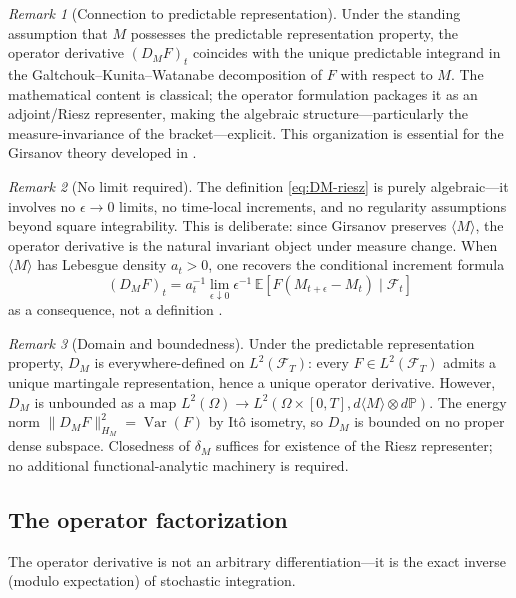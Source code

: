 \documentclass[11pt]{article}
\theoremstyle{plain}
\theoremstyle{definition}
\theoremstyle{remark}
\newtheorem{remark}{Remark}[section]
\newcommand{\E}{\mathbb{E}}
\newcommand{\F}{\mathcal{F}}
\newcommand{\PP}{\mathbb{P}}
\newcommand{\bracket}[1]{\langle #1 \rangle}
\DeclareMathOperator{\Var}{Var}
\begin{document}
\begin{remark}[Connection to predictable representation]\label{rem:connection-rep}
Under the standing assumption that $M$ possesses the predictable representation
property, the operator derivative $(D_M F)_t$ coincides with the unique predictable
integrand in the Galtchouk--Kunita--Watanabe decomposition of $F$ with respect to $M$.
The mathematical content is classical; the operator formulation packages it as an
adjoint/Riesz representer, making the algebraic structure---particularly the
measure-invariance of the bracket---explicit. This organization is essential for
the Girsanov theory developed in .
\end{remark}

\begin{remark}[No limit required]\label{rem:no-epsilon}
The definition \eqref{eq:DM-riesz} is purely algebraic---it involves no
$\epsilon \to 0$ limits, no time-local increments, and no regularity
assumptions beyond square integrability. This is deliberate: since Girsanov
preserves $\bracket{M}$, the operator derivative is the natural invariant
object under measure change. When $\bracket{M}$ has Lebesgue density $a_t > 0$,
one recovers the conditional increment formula
\[
(D_M F)_t = a_t^{-1}\lim_{\epsilon \downarrow 0} \epsilon^{-1}\,
\E[F(M_{t+\epsilon} - M_t) \mid \F_t]
\]
as a consequence, not a definition \cite{Fontes2026g}.
\end{remark}

\begin{remark}[Domain and boundedness]\label{rem:domain}
Under the predictable representation property, $D_M$ is everywhere-defined on
$L^2(\F_T)$: every $F \in L^2(\F_T)$ admits a unique martingale representation,
hence a unique operator derivative. However, $D_M$ is unbounded as a map
$L^2(\Omega) \to L^2(\Omega \times [0,T], d\bracket{M} \otimes d\PP)$. The
energy norm $\|D_M F\|_{H_M}^2 = \Var(F)$ by It\^o isometry, so $D_M$ is
bounded on no proper dense subspace. Closedness of $\delta_M$ suffices for
existence of the Riesz representer; no additional functional-analytic machinery
is required.
\end{remark}

\subsection{The operator factorization}

The operator derivative is not an arbitrary differentiation---it is the
exact inverse (modulo expectation) of stochastic integration.
\end{document}
